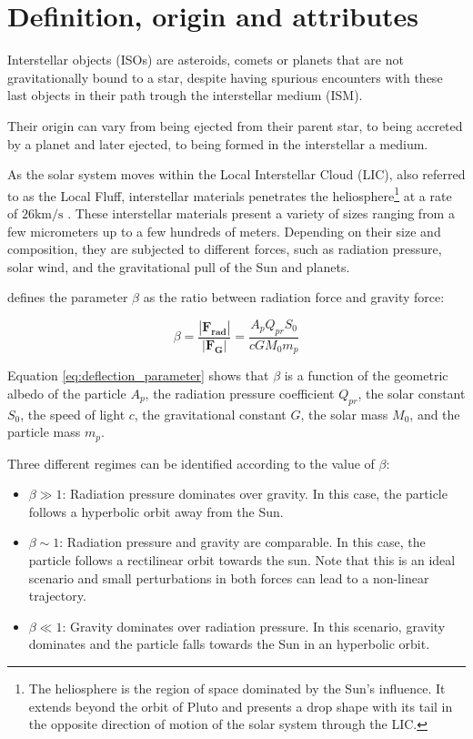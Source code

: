 \section{Definition, origin and attributes}

Interstellar objects (ISOs) are asteroids, comets or planets that are not
gravitationally bound to a star, despite having spurious encounters with these
last objects in their path trough the interstellar medium (ISM).

Their origin can vary from being ejected from their parent star, to being
accreted by a planet and later ejected, to being formed in the interstellar
a medium.

As the solar system moves within the Local Interstellar Cloud (LIC), also
referred to as the Local Fluff, interstellar materials penetrates the
heliosphere\footnote{The heliosphere is the region of space dominated by the
Sun's influence. It extends beyond the orbit of Pluto and presents a drop shape
with its tail in the opposite direction of motion of the solar system through
the LIC.} at a rate of $26\text{km/s}$ \cite{hajdukova2020}. These interstellar
materials present a variety of sizes ranging from a few micrometers up to a few
hundreds of meters. Depending on their size and composition, they are subjected
to different forces, such as radiation pressure, solar wind, and the
gravitational pull of the Sun and planets.

\cite{sterken2012} defines the parameter $\beta$ as the ratio between radiation
force and gravity force:

\begin{equation}
    \beta = \frac{|\bm{F_{\text{rad}}}|}{|\bm{F_{\text{G}}}|} = \frac{A_p Q_{pr} S_0}{cG M_{0} m_p}
    \label{eq:deflection_parameter}
\end{equation}

Equation \ref{eq:deflection_parameter} shows that $\beta$ is a function of the
geometric albedo of the particle $A_p$, the radiation pressure coefficient $Q_{pr}$,
the solar constant $S_0$, the speed of light $c$, the gravitational constant $G$,
the solar mass $M_0$, and the particle mass $m_p$.

Three different regimes can be identified according to the value of $\beta$:

\begin{itemize}
    \item $\beta \gg 1$: Radiation pressure dominates over gravity. In this case,
          the particle follows a hyperbolic orbit away from the Sun.
    \item $\beta \sim 1$: Radiation pressure and gravity are comparable. In this
          case, the particle follows a rectilinear orbit towards the sun. Note
          that this is an ideal scenario and small perturbations in both
          forces can lead to a non-linear trajectory.
    \item $\beta \ll 1$: Gravity dominates over radiation pressure. In this
          scenario, gravity dominates and the particle falls towards the Sun in an
          hyperbolic orbit.
\end{itemize}

